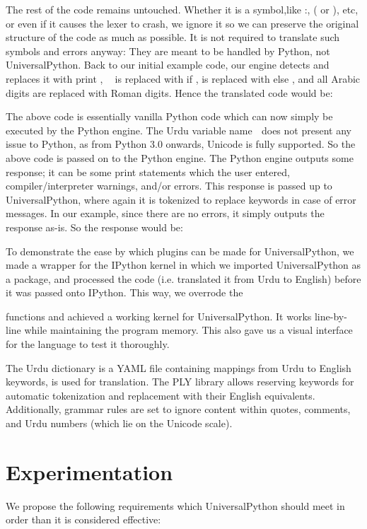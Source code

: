 \documentclass[conference]{IEEEtran}
\begin{document}
The rest of the code remains untouched. Whether it is a symbol,like :, ( or ), etc, or even if it causes the lexer to crash, we ignore it so we can preserve the original structure of the code as much as possible. It is not required to translate such symbols and errors anyway: They are meant to be handled by Python, not UniversalPython. Back to our initial example code, our engine detects and replaces it with print , 􏰁􏰃 is replaced with if ,
is replaced with else , and all Arabic digits are replaced with Roman digits. Hence the translated code would be:

The above code is essentially vanilla Python code which can now simply be executed by the Python engine. The Urdu variable name 􏰀 does not present any issue to Python, as from Python 3.0 onwards, Unicode is fully supported. So the above code is passed on to the Python engine. The Python engine outputs some response; it can be some print statements which the user entered, compiler/interpreter warnings, and/or errors. This response is passed up to UniversalPython, where again it is tokenized to replace keywords in case of error messages. In our example, since there are no errors, it simply outputs the response as-is. So the response would be:

To demonstrate the ease by which plugins can be made for UniversalPython, we made a wrapper for the IPython kernel in which we imported UniversalPython as a package, and processed the code (i.e. translated it from Urdu to English) before it was passed onto IPython. This way, we overrode the

functions and achieved a working kernel for UniversalPython. It works line-by-line while maintaining the program memory. This also gave us a visual interface for the language to test it thoroughly.

The Urdu dictionary is a YAML file containing mappings from Urdu to English keywords, is used for translation. The PLY library allows reserving keywords for automatic tokenization and replacement with their English equivalents. Additionally, grammar rules are set to ignore content within quotes, comments, and Urdu numbers (which lie on the Unicode scale).

\section{Experimentation}

We propose the following requirements which UniversalPython should meet in order than it is considered effective:
\end{document}
